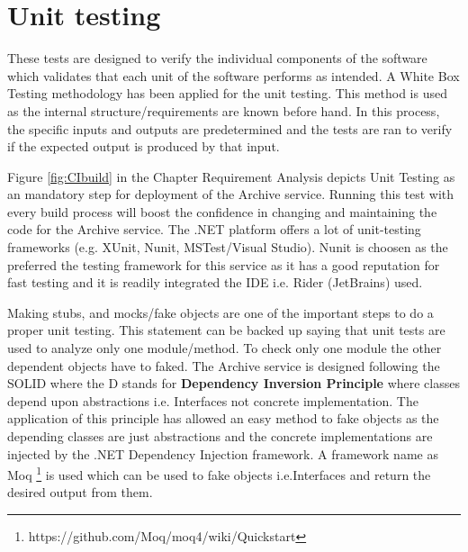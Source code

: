 \section{Unit testing}
These tests are designed to verify the individual components of the software which validates that each unit of the software performs as intended. A White Box
Testing methodology has been applied for the unit testing. This method is used as the internal structure/requirements are known before hand. In this process,
the specific inputs and outputs are predetermined and the tests are ran to verify if the expected output is produced by that input. 

\par
Figure \ref{fig:CIbuild} in the Chapter Requirement Analysis depicts
Unit Testing as an mandatory step for deployment of the Archive service. Running this test with every build process will boost the confidence 
in changing and maintaining the code for the Archive service. The .NET platform offers a lot of unit-testing frameworks 
(e.g. XUnit, Nunit, MSTest/Visual Studio). Nunit is choosen as the preferred the testing framework for this service as it has a good reputation for
fast testing and it is readily integrated the IDE i.e. Rider (JetBrains) used. 

\par
Making stubs, and mocks/fake objects are one of the important steps to do a proper unit testing. This statement can be backed up saying that unit tests are
used to analyze only one module/method. To check only one module the other dependent objects have to faked. The Archive service is designed following the
SOLID \cite{Hotop2015} where the D stands for \textbf{Dependency Inversion Principle} where classes depend upon abstractions i.e. Interfaces not concrete
implementation. The application of this principle has allowed an easy method to fake objects as the depending classes are just abstractions and the concrete 
implementations are injected by the .NET Dependency Injection framework. A framework name as Moq \footnote{https://github.com/Moq/moq4/wiki/Quickstart} is used
which can be used to fake objects i.e.Interfaces and return the desired output from them. 

